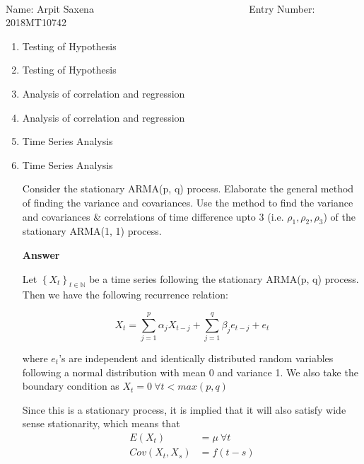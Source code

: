 \documentclass[12pt, oneside]{article}
\begin{document}
\setlength{\textheight}{8.5in}
\\





\vskip 0.5cm

\noindent Name: Arpit Saxena ~~~  ~~~~~ ~~~~ ~~~~~~~~~~~~~~~~ Entry Number: 2018MT10742 ~~~~~~~~~~~



\vskip 0.5cm



\begin{enumerate}
	



\item	Testing of Hypothesis


\item	 Testing of Hypothesis


\item	Analysis of correlation and regression 



\item	Analysis of correlation and regression 


\item	Time Series Analysis


\item {
    Time Series Analysis

    Consider the stationary ARMA(p, q) process. Elaborate the general method of finding the
    variance and covariances. Use the method to find the variance and covariances \&
    correlations of time difference upto 3 (i.e. \(\rho_1, \rho_2, \rho_3\)) of the stationary ARMA(1, 1)
    process.

    \textbf{Answer}

    Let \(\left\{X_t\right\}_{t \in \mathbb{N}}\) be a time series following the
    stationary ARMA(p, q) process. Then we have the following recurrence relation:

    \[X_t = \sum_{j=1}^{p}\alpha_j X_{t-j} + \sum_{j=1}^{q} \beta_j e_{t-j} + e_t\]

    where \(e_t\)'s are independent and identically distributed random variables following
    a normal distribution with mean 0 and variance 1. We also take the boundary condition as
    \(X_t = 0 ~\forall t < max(p, q)\)

    Since this is a stationary process, it is implied that it will also satisfy
    wide sense stationarity, which means that
    \begin{align*}
        E(X_t) &= \mu ~\forall t \\
        Cov(X_t, X_s) &= f(t - s)
    \end{align*}

}
\end{enumerate}
\end{document}
